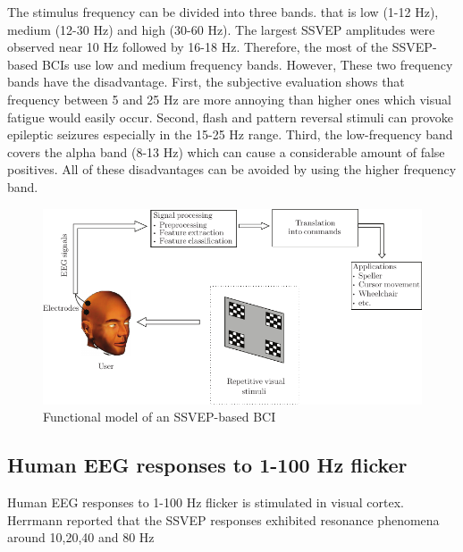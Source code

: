 \hspace{1.5cm} The stimulus frequency can be divided into three bands. that is low (1-12 Hz), medium (12-30 Hz) and high (30-60 Hz). The largest SSVEP amplitudes were observed near 10 Hz followed by 16-18 Hz. Therefore, the most of the SSVEP-based BCIs use low and medium frequency bands. However, These two frequency bands have the disadvantage. First, the subjective evaluation shows that frequency between 5 and 25 Hz are more annoying than higher ones which visual fatigue would easily occur. Second, flash and pattern reversal stimuli can provoke epileptic seizures especially in the 15-25 Hz range. Third, the low-frequency band covers the alpha band (8-13 Hz) which can cause a considerable amount of false positives. All of these disadvantages can be avoided by using the higher frequency band.  

\begin{figure}[ht]
	\centering
	\includegraphics[scale = 1.2]{chapter2/210.pdf}
	\caption{ Functional model of an SSVEP-based BCI}
\end{figure}  

\newpage
\subsection {Human EEG responses to 1-100 Hz flicker\cite{ref8}}

\hspace{1.5cm} Human EEG responses to 1-100 Hz flicker is stimulated in visual cortex. Herrmann reported that the SSVEP responses exhibited resonance phenomena around 10,20,40 and 80 Hz

